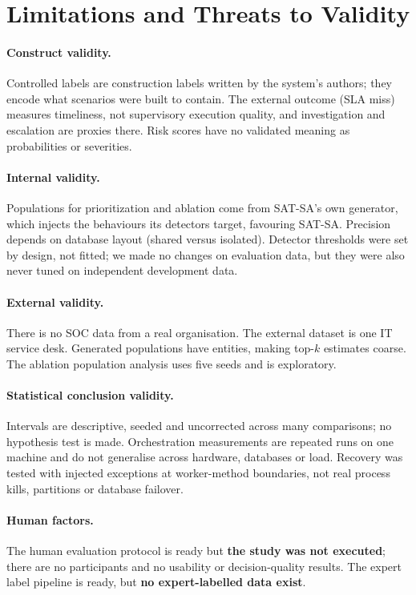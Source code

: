 \section{Limitations and Threats to Validity}
\label{sec:limitations}

\paragraph{Construct validity.}
Controlled labels are construction labels written by the system's authors; they
encode what scenarios were built to contain. The external outcome (SLA miss)
measures timeliness, not supervisory execution quality, and investigation and
escalation are proxies there. Risk scores have no validated meaning as
probabilities or severities.

\paragraph{Internal validity.}
Populations for prioritization and ablation come from SAT-SA's own generator,
which injects the behaviours its detectors target, favouring SAT-SA. Precision
depends on database layout (shared versus isolated). Detector thresholds were set
by design, not fitted; we made no changes on evaluation data, but they were also
never tuned on independent development data.

\paragraph{External validity.}
There is no SOC data from a real organisation. The external dataset is one IT
service desk. Generated populations have  entities, making top-$k$
estimates coarse. The ablation population analysis uses five seeds and is
exploratory.

\paragraph{Statistical conclusion validity.}
Intervals are descriptive, seeded and uncorrected across many comparisons; no
hypothesis test is made. Orchestration measurements are repeated runs on one
machine and do not generalise across hardware, databases or load. Recovery was
tested with injected exceptions at worker-method boundaries, not real process
kills, partitions or database failover.

\paragraph{Human factors.}
The human evaluation protocol is ready but \textbf{the study was not executed};
there are no participants and no usability or decision-quality results. The expert
label pipeline is ready, but \textbf{no expert-labelled data exist}.

